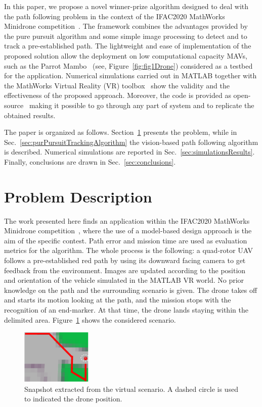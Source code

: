 \documentclass[a4paper,twocolumn,10pt]{article}
\begin{document}
    In this paper, we propose a novel winner-prize algorithm designed to deal with the path following problem in the context of the IFAC2020 MathWorks Minidrone 
    competition~\cite{4_Mathworks_url}. The framework combines the advantages provided by the pure pursuit algorithm and some simple image processing to detect and to track a pre-established path. The lightweight and ease of implementation of the proposed solution allow the deployment on low computational 
    capacity MAVs, such as the Parrot Mambo~\cite{15_Mathworks_url} (see, Figure~\ref{fig:fig1Drone}) considered as a testbed for the application. Numerical simulations 
    carried out in MATLAB together with the MathWorks Virtual Reality (VR) toolbox~\cite{SilanoMATFly} show the validity and the effectiveness of the proposed approach. Moreover, the code is provided as 
    open-source~\cite{GitHubCode} making it possible to go through any part of system and to replicate the obtained results. 

    The paper is organized as follows. Section~\ref{sec:problemDescription} presents the problem, while in Sec.~\ref{sec:purPursuitTrackingAlgorithm} the vision-based path following algorithm is 
    described. Numerical simulations are reported in Sec.~\ref{sec:simulationsResults}. Finally, conclusions are drawn in Sec.~\ref{sec:conclusions}. 

    \section{Problem Description}
    \label{sec:problemDescription}

    The work presented here finds an application within the IFAC2020 MathWorks Minidrone competition~\cite{4_Mathworks_url}, where the use of a model-based design approach is the aim of the specific contest. Path error and mission time are used as evaluation metrics for the algorithm. The whole process is the following: a quad-rotor UAV follows a pre-established red path by using its downward facing camera to get feedback from the environment. Images are updated according to the position and orientation of the vehicle simulated in the MATLAB VR world. No prior knowledge on the path and the surrounding scenario is given. The drone takes off and starts its  motion looking at the path, and the mission stops with the recognition of an end-marker. At that time, the drone lands staying within the delimited area. 
    Figure~\ref{fig:fig2track} shows the considered scenario. 

    \begin{figure}
        \centering
        \includegraphics[width=0.3\textwidth]{pics/fig2_track.png}
        \caption{Snapshot extracted from the virtual scenario. A dashed circle is used to indicated the drone position.}
        \label{fig:fig2track}
    \end{figure}
\end{document}
